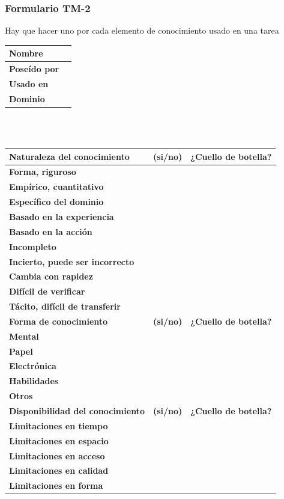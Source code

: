 \documentclass[a4paper,11pt]{article}
\begin{document}
			\subsubsection{Formulario TM-2}
			Hay que hacer uno por cada elemento de conocimiento usado en una tarea
			\begin{center}
				\begin{tabular}{| l | l |}
					\hline
					\textbf{Nombre} & \\
					\hline
					\textbf{Poseído por} & \\
					\hline
					\textbf{Usado en} & \\
					\hline
					\textbf{Dominio} & \\
					\hline
				\end{tabular}
				\\
				\textbf{}
				\\
				\begin{tabular}{| p{6.3cm} | l | p{3.8cm} |}
					\hline
					\textbf{Naturaleza del conocimiento} & \textbf{(si/no)} & \textbf{¿Cuello
					de botella?}\\
					\hline
					\textbf{Forma, riguroso} & & \\
					\hline
					\textbf{Empírico, cuantitativo} & & \\
					\hline
					\textbf{Específico del dominio} & & \\
					\hline
					\textbf{Basado en la experiencia} & & \\
					\hline
					\textbf{Basado en la acción} & & \\
					\hline
					\textbf{Incompleto} & & \\
					\hline
					\textbf{Incierto, puede ser incorrecto} & & \\
					\hline
					\textbf{Cambia con rapidez} & & \\
					\hline
					\textbf{Difícil de verificar} & & \\
					\hline
					\textbf{Tácito, difícil de transferir} & & \\
					\hline
					\textbf{Forma de conocimiento} & \textbf{(si/no)} & \textbf{¿Cuello
					de botella?}\\
					\hline
					\textbf{Mental} & & \\
					\hline
					\textbf{Papel} & & \\
					\hline
					\textbf{Electrónica} & & \\
					\hline
					\textbf{Habilidades} & & \\
					\hline
					\textbf{Otros} & & \\
					\hline
					\textbf{Disponibilidad del conocimiento} & \textbf{(si/no)} & \textbf{¿Cuello
					de botella?}\\
					\hline
					\textbf{Limitaciones en tiempo} & & \\
					\hline
					\textbf{Limitaciones en espacio} & & \\
					\hline
					\textbf{Limitaciones en acceso} & & \\
					\hline
					\textbf{Limitaciones en calidad} & & \\
					\hline
					\textbf{Limitaciones en forma} & & \\
					\hline
				\end{tabular}
			\end{center}
\end{document}
